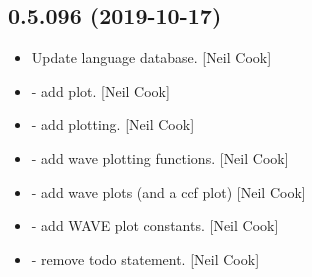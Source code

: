 \documentclass[a4paper,10pt,english]{report}
\begin{document}
\subsection{0.5.096 (2019-10-17)}
\label{\detokenize{misc/changelog:id47}}\begin{itemize}
\item {} 
Update language database. {[}Neil Cook{]}

\item {} 
 - add  plot. {[}Neil Cook{]}

\item {} 
 - add plotting. {[}Neil Cook{]}

\item {} 
 - add wave plotting functions. {[}Neil Cook{]}

\item {} 
 - add wave plots (and a
ccf plot) {[}Neil Cook{]}

\item {} 
 - add WAVE plot constants.
{[}Neil Cook{]}

\item {} 
 - remove todo statement. {[}Neil Cook{]}

\end{itemize}
\end{document}
